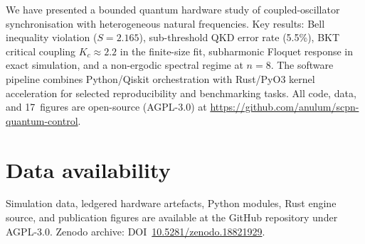 \documentclass[twocolumn,prl,superscriptaddress,showpacs,floatfix]{revtex4-2}
\begin{document}
We have presented a bounded quantum hardware study of
coupled-oscillator synchronisation with heterogeneous natural
frequencies. Key results: Bell inequality violation ($S = 2.165$),
sub-threshold QKD error rate (5.5\%), BKT critical coupling
$K_c \approx 2.2$ in the finite-size fit, subharmonic Floquet response in
exact simulation, and a non-ergodic spectral regime at $n = 8$. The
software pipeline combines Python/Qiskit orchestration with Rust/PyO3
kernel acceleration for selected reproducibility and benchmarking tasks.
All code, data, and 17~figures are open-source (AGPL-3.0) at
\url{https://github.com/anulum/scpn-quantum-control}.

\section*{Data availability}

Simulation data, ledgered hardware artefacts, Python modules, Rust engine
source, and publication figures are available at the GitHub repository under
AGPL-3.0. Zenodo archive:
DOI~\href{https://doi.org/10.5281/zenodo.18821929}{10.5281/zenodo.18821929}.
\end{document}
